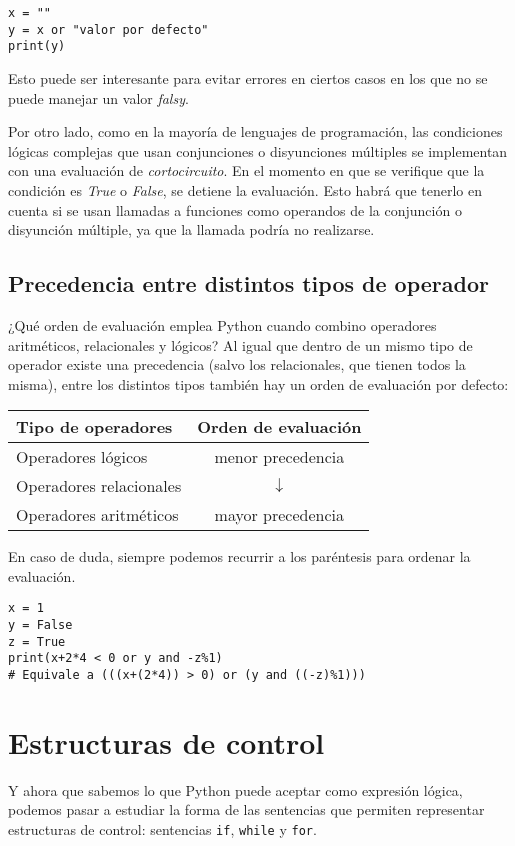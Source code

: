 \begin{lstlisting}
x = ""
y = x or "valor por defecto"
print(y)
\end{lstlisting}

Esto puede ser interesante para evitar errores en ciertos casos en los que no se puede manejar un valor \emph{falsy}.

Por otro lado, como en la mayoría de lenguajes de programación, las condiciones lógicas complejas que usan conjunciones o disyunciones múltiples se implementan con una evaluación de \emph{cortocircuito}. En el momento en que se verifique que la condición es \emph{True} o \emph{False}, se detiene la evaluación. Esto habrá que tenerlo en cuenta si se usan llamadas a funciones como operandos de la conjunción o disyunción múltiple, ya que la llamada podría no realizarse.

\subsection{Precedencia entre distintos tipos de operador}

¿Qué orden de evaluación emplea Python cuando combino operadores aritméticos, relacionales y lógicos? Al igual que dentro de un mismo tipo de operador existe una precedencia (salvo los relacionales, que tienen todos la misma), entre los distintos tipos también hay un orden de evaluación por defecto: 

\begin{tabular}{l|c}
	Tipo de operadores & Orden de evaluación\\
	\hline\hline
	Operadores lógicos & menor precedencia\\
	\cline{1-1}
	Operadores relacionales & $\downarrow$\\
	\cline{1-1}
	Operadores aritméticos & mayor precedencia
\end{tabular}

En caso de duda, siempre podemos recurrir a los paréntesis para ordenar la evaluación.

\begin{lstlisting}
x = 1
y = False
z = True
print(x+2*4 < 0 or y and -z%1)
# Equivale a (((x+(2*4)) > 0) or (y and ((-z)%1)))
\end{lstlisting}

\section{Estructuras de control}

Y ahora que sabemos lo que Python puede aceptar como expresión lógica, podemos pasar a estudiar la forma de las sentencias que permiten representar estructuras de control: sentencias \texttt{if}, \texttt{while} y \texttt{for}.

